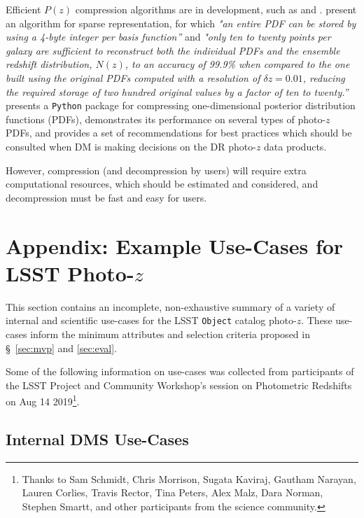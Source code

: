 \documentclass[DM,lsstdraft,toc]{lsstdoc}
\begin{document}
Efficient $P(z)$ compression algorithms are in development, such as \citet{2014MNRAS.441.3550C} and \citet{2018AJ....156...35M}.
\citet{2014MNRAS.441.3550C} present an algorithm for sparse representation, for which {\it "an entire PDF can be stored by using a 4-byte integer per basis function''} and {\it "only ten to twenty points per galaxy are sufficient to reconstruct both the individual PDFs and the ensemble redshift distribution, $N(z)$, to an accuracy of 99.9\% when compared to the one built using the original PDFs computed with a resolution of $\delta z = 0.01$, reducing the required storage of two hundred original values by a factor of ten to twenty.''} 
\citet{2018AJ....156...35M} presents a {\tt Python} package for compressing one-dimensional posterior distribution functions (PDFs), demonstrates its performance on several types of photo-$z$ PDFs, and provides a set of recommendations for best practices which should be consulted when DM is making decisions on the DR photo-$z$ data products.

However, compression (and decompression by users) will require extra computational resources, which should be estimated and considered, and decompression must be fast and easy for users.


\clearpage
\section{Appendix: Example Use-Cases for LSST Photo-$z$} \label{sec:use}

This section contains an incomplete, non-exhaustive summary of a variety of internal and scientific use-cases for the LSST {\tt Object} catalog photo-$z$.
These use-cases inform the minimum attributes and selection criteria proposed in \S~\ref{sec:mvp} and \ref{sec:eval}. 

Some of the following information on use-cases was collected from participants of the LSST Project and Community Workshop's session on Photometric Redshifts on Aug 14 2019\footnote{Thanks to Sam Schmidt, Chris Morrison, Sugata Kaviraj, Gautham Narayan, Lauren Corlies, Travis Rector, Tina Peters, Alex Malz, Dara Norman, Stephen Smartt, and other participants from the science community.}.

\subsection{Internal DMS Use-Cases}\label{ssec:use_dm}
\end{document}
